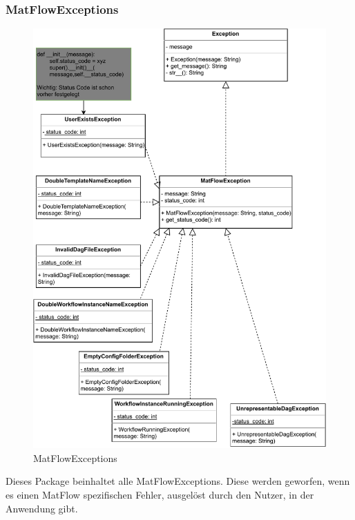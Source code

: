 \subsubsection{MatFlowExceptions}
\begin{figure}[H]
    \includegraphics[width=1\textwidth]{res/Klassen/MatFlowExceptions.drawio.pdf}
    \caption{MatFlowExceptions}
\end{figure}
Dieses Package beinhaltet alle MatFlowExceptions. Diese werden geworfen, wenn es einen MatFlow spezifischen Fehler, ausgelöst 
durch den Nutzer, in der Anwendung gibt.


\newpage